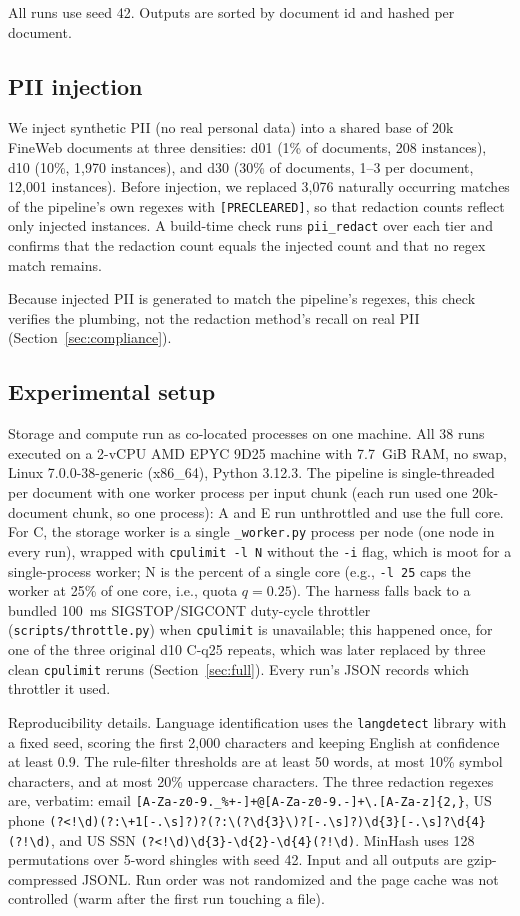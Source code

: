 \documentclass[11pt]{article}
\begin{document}
All runs use seed 42. Outputs are sorted by document id and hashed per document.

\subsection{PII injection}

We inject synthetic PII (no real personal data) into a shared base of 20k FineWeb documents at three densities: d01 (1\% of documents, 208 instances), d10 (10\%, 1,970 instances), and d30 (30\% of documents, 1--3 per document, 12,001 instances). Before injection, we replaced 3,076 naturally occurring matches of the pipeline's own regexes with \texttt{[PRECLEARED]}, so that redaction counts reflect only injected instances. A build-time check runs \texttt{pii\_redact} over each tier and confirms that the redaction count equals the injected count and that no regex match remains.

Because injected PII is generated to match the pipeline's regexes, this check verifies the plumbing, not the redaction method's recall on real PII (Section~\ref{sec:compliance}).

\subsection{Experimental setup}
\label{sec:setup}

Storage and compute run as co-located processes on one machine. All 38 runs executed on a 2-vCPU AMD EPYC 9D25 machine with 7.7~GiB RAM, no swap, Linux 7.0.0-38-generic (x86\_64), Python 3.12.3. The pipeline is single-threaded per document with one worker process per input chunk (each run used one 20k-document chunk, so one process): A and E run unthrottled and use the full core. For C, the storage worker is a single \texttt{\_worker.py} process per node (one node in every run), wrapped with \texttt{cpulimit -l N} without the \texttt{-i} flag, which is moot for a single-process worker; N is the percent of a single core (e.g., \texttt{-l 25} caps the worker at 25\% of one core, i.e., quota $q = 0.25$). The harness falls back to a bundled 100~ms SIGSTOP/SIGCONT duty-cycle throttler (\texttt{scripts/throttle.py}) when \texttt{cpulimit} is unavailable; this happened once, for one of the three original d10 C-q25 repeats, which was later replaced by three clean \texttt{cpulimit} reruns (Section~\ref{sec:full}). Every run's JSON records which throttler it used.

Reproducibility details. Language identification uses the \texttt{langdetect} library with a fixed seed, scoring the first 2,000 characters and keeping English at confidence at least 0.9. The rule-filter thresholds are at least 50 words, at most 10\% symbol characters, and at most 20\% uppercase characters. The three redaction regexes are, verbatim: email \verb|[A-Za-z0-9._%+-]+@[A-Za-z0-9.-]+\.[A-Za-z]{2,}|, US phone \verb|(?<!\d)(?:\+1[-.\s]?)?(?:\(?\d{3}\)?[-.\s]?)\d{3}[-.\s]?\d{4}(?!\d)|, and US SSN \verb|(?<!\d)\d{3}-\d{2}-\d{4}(?!\d)|. MinHash uses 128 permutations over 5-word shingles with seed 42. Input and all outputs are gzip-compressed JSONL. Run order was not randomized and the page cache was not controlled (warm after the first run touching a file).
\end{document}
